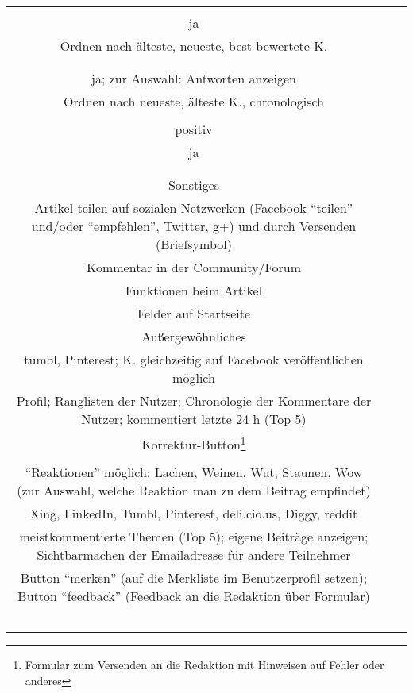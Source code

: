 \begin{landscape}
\begin{tabular}{ccc}
{		\\
		ja\\
		Ordnen nach älteste, neueste, best bewertete K.\\
		&
		\\
		\\
		ja; zur Auswahl: Antworten anzeigen\\
		Ordnen nach neueste, älteste K., chronologisch\\
		&
		\\
		positiv\\
		ja\\
		\\
		&
		\\ \hline
		
		


		
Sonstiges\\ 
Artikel teilen auf sozialen Netzwerken (Facebook ``teilen'' und/oder ``empfehlen'', Twitter, g+) und durch Versenden (Briefsymbol)\\
Kommentar in der Community/Forum\\
Funktionen beim Artikel\\
Felder auf Startseite\\
Außergewöhnliches
&		%
		\\
		tumbl, Pinterest; K. gleichzeitig auf Facebook veröffentlichen möglich \\
		Profil; Ranglisten der Nutzer; Chronologie der Kommentare der Nutzer; kommentiert letzte 24 h (Top 5)\\
		Korrektur-Button\footnote{Formular zum Versenden an die Redaktion mit Hinweisen auf Fehler oder anderes}\\
		\\
		``Reaktionen'' möglich: Lachen, Weinen, Wut, Staunen, Wow (zur Auswahl, welche Reaktion man zu dem Beitrag empfindet)
		&
		\\
		Xing, LinkedIn, Tumbl, Pinterest, deli.cio.us, Diggy, reddit\\
		meistkommentierte Themen (Top 5); eigene Beiträge anzeigen; Sichtbarmachen der Emailadresse für andere Teilnehmer\\
		Button ``merken'' (auf die Merkliste im Benutzerprofil setzen); Button ``feedback'' (Feedback an die Redaktion über Formular) \\
		\\
		\\
		&
		\\
		\\
}
\end{tabular}
\end{landscape}
